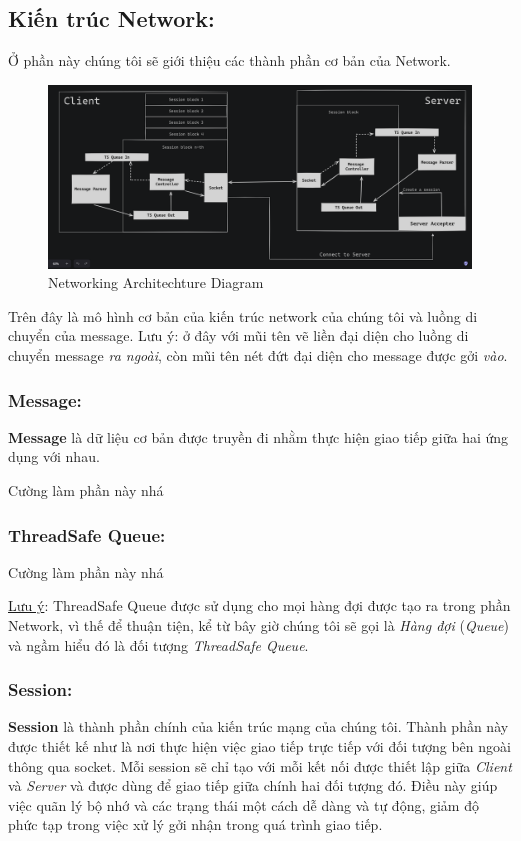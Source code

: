 \subsection{Kiến trúc Network: }
Ở phần này chúng tôi sẽ giới thiệu các thành phần cơ bản của Network. \\

\begin{figure}[H]
	\centering
	\includegraphics[width=\linewidth]{latex/architechture/architechture_diagram.png}
	\caption{Networking Architechture Diagram}
	\label{fig:network}
\end{figure}

Trên đây là mô hình cơ bản của kiến trúc network của chúng tôi và luồng di chuyển của message. Lưu ý: ở đây với mũi tên vẽ liền đại diện cho luồng di chuyển message \textit{ra ngoài}, còn mũi tên nét đứt đại diện cho message được gởi \textit{vào}.

\subsubsection{Message: }
\textbf{Message} là dữ liệu cơ bản được truyền đi nhằm thực hiện giao tiếp giữa hai ứng dụng với nhau.

Cường làm phần này nhá
\subsubsection{ThreadSafe Queue: }
Cường làm phần này nhá

\underline{Lưu ý}: ThreadSafe Queue được sử dụng cho mọi hàng đợi được tạo ra trong phần Network, vì thế để thuận tiện, kể từ bây giờ chúng tôi sẽ gọi là \textit{Hàng đợi} (\textit{Queue}) và ngầm hiểu đó là đối tượng \textit{ThreadSafe Queue}.

\subsubsection{Session: }
\textbf{Session} là thành phần chính của kiến trúc mạng của chúng tôi. Thành phần này được thiết kế như là nơi thực hiện việc giao tiếp trực tiếp với đối tượng bên ngoài thông qua socket. Mỗi session sẽ chỉ tạo với mỗi kết nối được thiết lập giữa \textit{Client} và \textit{Server} và được dùng để giao tiếp giữa chính hai đối tượng đó. Điều này giúp việc quãn lý bộ nhớ và các trạng thái một cách dễ dàng và tự động, giảm độ phức tạp trong việc xử lý gởi nhận trong quá trình giao tiếp.

